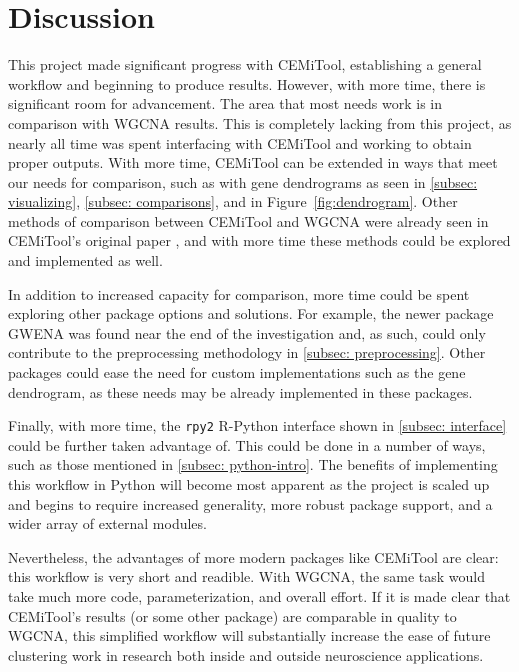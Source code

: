 \FloatBarrier

\section{Discussion}

This project made significant progress with CEMiTool, establishing a general workflow and beginning to produce results. However, with more time, there is significant room for advancement. The area that most needs work is in comparison with WGCNA results. This is completely lacking from this project, as nearly all time was spent interfacing with CEMiTool and working to obtain proper outputs. With more time, CEMiTool can be extended in ways that meet our needs for comparison, such as with gene dendrograms as seen in \ref{subsec: visualizing}, \ref{subsec: comparisons}, and in Figure~\ref{fig:dendrogram}. Other methods of comparison between CEMiTool and WGCNA were already seen in CEMiTool's original paper \cite{cem}, and with more time these methods could be explored and implemented as well. 

In addition to increased capacity for comparison, more time could be spent exploring other package options and solutions. For example, the newer package GWENA \cite{gwena} was found near the end of the investigation and, as such, could only contribute to the preprocessing methodology in \ref{subsec: preprocessing}. Other packages could ease the need for custom implementations such as the gene dendrogram, as these needs may be already implemented in these packages. 

Finally, with more time, the \texttt{rpy2} R-Python interface shown in \ref{subsec: interface} could be further taken advantage of. This could be done in a number of ways, such as those mentioned in \ref{subsec: python-intro}. The benefits of implementing this workflow in Python will become most apparent as the project is scaled up and begins to require increased generality, more robust package support, and a wider array of external modules.

Nevertheless, the advantages of more modern packages like CEMiTool are clear: this workflow is very short and readible. With WGCNA, the same task would take much more code, parameterization, and overall effort. If it is made clear that CEMiTool's results (or some other package) are comparable in quality to WGCNA, this simplified workflow will substantially increase the ease of future clustering work in research both inside and outside neuroscience applications.




\address{Benjamin Koppe\\
  University of Arizona\\
  Department of Computer Science\\
  United States\\}

\address{Dr. Charles Higgins\\
  University of Arizona\\
  Department of Neuroscience\\
  Department of Electrical Engineering\\
  United States\\}
